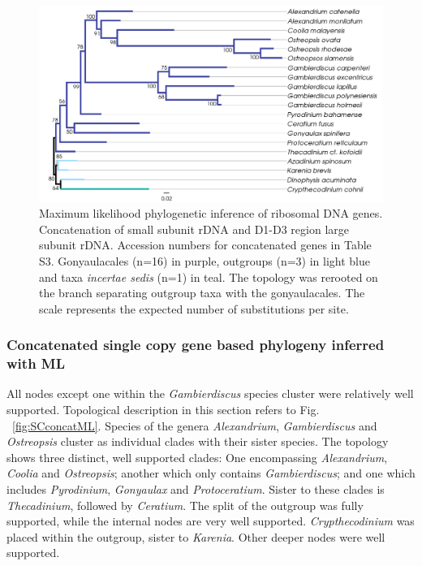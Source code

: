 \documentclass[fleqn,10pt,lineno]{wlpeerj} %
\begin{document}
\begin{figure}[ht]
\centering
\includegraphics[width=\linewidth]{gonya-figs/rDNA-ML.png} 
\caption{Maximum likelihood phylogenetic inference of ribosomal DNA genes. Concatenation of small subunit rDNA and D1-D3 region large subunit rDNA. Accession numbers for concatenated genes in Table S3. Gonyaulacales (n=16) in purple, outgroups (n=3) in light blue and taxa \textit{incertae sedis} (n=1) in teal. The topology was rerooted on the branch separating outgroup taxa with the gonyaulacales. The scale represents the expected number of substitutions per site.} 
\label{fig:rdna}
\end{figure} 

\subsubsection*{Concatenated single copy gene based phylogeny inferred with ML}
All nodes except one within the \emph{Gambierdiscus} species cluster were relatively well supported. 
Topological description in this section refers to Fig. ~\ref{fig:SCconcatML}. 
Species of the genera \emph{Alexandrium}, \emph{Gambierdiscus} and \emph{Ostreopsis} cluster as individual clades with their sister species.  
The topology shows three distinct, well supported clades: 
One encompassing \emph{Alexandrium}, \emph{Coolia} and \emph{Ostreopsis}; another which only contains \emph{Gambierdiscus}; and one which includes \emph{Pyrodinium}, \emph{Gonyaulax} and \emph{Protoceratium}. 
Sister to these clades is \emph{Thecadinium}, followed by \emph{Ceratium}.
The split of the outgroup was fully supported, while the internal nodes are very well supported. 
\emph{Crypthecodinium} was placed within the outgroup, sister to \emph{Karenia}. 
Other deeper nodes were well supported.
 
\end{document}
